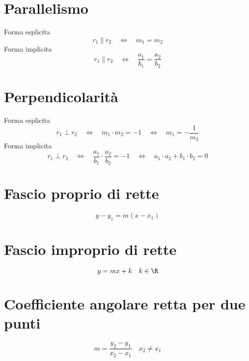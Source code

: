 \section{Parallelismo}
Forma esplicita
\begin{equation*}
r_1\parallel r_2\quad\Longleftrightarrow\quad	m_1=m_2
\end{equation*}
Forma implicita
\begin{equation*}
r_1\parallel r_2\quad\Longleftrightarrow\quad \dfrac{a_1}{b_1}=\dfrac{a_2}{b_2}
\end{equation*}
\section{Perpendicolarità}
Forma esplicita
\begin{equation*}
r_1\perp r_2\quad\Longleftrightarrow\quad	m_1 \cdot m_2=-1\quad\Longleftrightarrow\quad	m_1=-\dfrac{1}{m_2}
\end{equation*}
Forma implicita
\begin{equation*}
r_1\perp r_2\quad\Longleftrightarrow\quad	\dfrac{a_1}{b_1}\cdot\dfrac{a_2}{b_2}=-1\quad\Longleftrightarrow\quad a_1\cdot a_2+b_1\cdot b_2=0
\end{equation*}
\section{Fascio proprio di rette}
\begin{equation*}
y-y_1=m(x-x_1)
\end{equation*}
\section{Fascio improprio di rette}
\begin{equation*}
y=mx+k\quad k\in\R
\end{equation*}
\section{Coefficiente angolare retta per due punti}
\begin{equation*}
m=\dfrac{y_2-y_1}{x_2-x_1}\quad x_2\neq x_1
\end{equation*}
